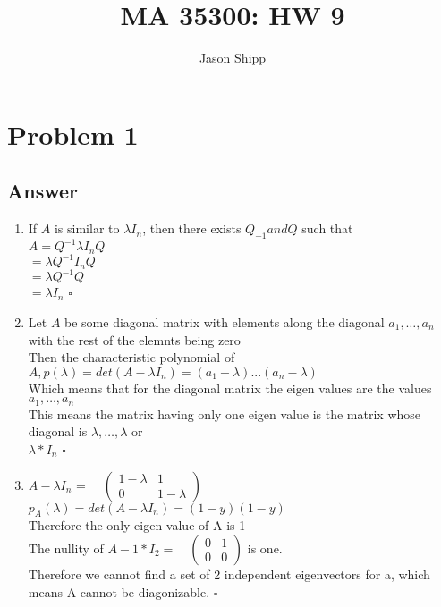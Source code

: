 \documentclass{article}
\begin{document}
\title{MA 35300: HW 9}
\author{Jason Shipp}
\maketitle
\section*{Problem 1}
\subsection*{Answer}
\begin{enumerate}[label=(\alph{*})]
  \item
    If \(A\) is similar to \(\lambda I_{n}\), then there exists \(Q_{-1} and Q\) such that\\
    \(A = Q^{-1}\lambda I_{n}Q\) \\
    \(  = \lambda Q^{-1}I_{n}Q\) \\
    \(  = \lambda Q^{-1}Q\) \\
    \(  = \lambda I_{n}\) \(\square\)
  \item
    Let \(A\) be some diagonal matrix with elements along the diagonal \(a_{1},\dots,a_{n}\) with the rest of the elemnts being zero \\
    Then the characteristic polynomial of \(A, p(\lambda) = det(A - \lambda I_{n}) = (a_{1} - \lambda)...(a_{n} - \lambda)\)\\
    Which means that for the diagonal matrix the eigen values are the values \(a_{1},\dots,a_{n}\) \\
    This means the matrix having only one eigen value is the matrix whose diagonal is \(\lambda,\dots,\lambda\) or \\
    \(\lambda * I_{n}\) \(\square\)
  \item
    \(A - \lambda I_{n}\) = \(\quad \begin{pmatrix} 1-\lambda & 1 \\ 0 & 1 - \lambda \end{pmatrix}\) \\
    \(p_{A}(\lambda) = det(A-\lambda I_{n}) = (1-y)(1-y)\) \\
    Therefore the only eigen value of A is 1 \\
    The nullity of \(A - 1 * I_{2} = \quad \begin{pmatrix} 0 & 1 \\ 0 & 0 \end{pmatrix}\) is one.\\
    Therefore we cannot find a set of 2 independent eigenvectors for a, which means A cannot be diagonizable. \(\square\)
\end{enumerate}    
\end{document}
